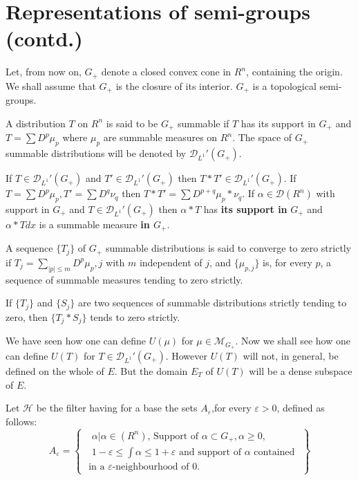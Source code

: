 
\chapter{Representations of semi-groups (contd.)}\label{chap19}

Let\pageoriginale, from now on, $G_+$ denote a closed convex cone in
$R^n$, containing the origin. We shall assume that $G_+$ is the
closure of its interior. $G_+$ is a topological semi-groups.
\setcounter{section}{19}
\setcounter{definition}{0}
\begin{definition}\label{chap19:def19.1}
A distribution $T$ on $R^n$ is said to be $G_+$ summable if $T$ has
its support in $G_+$ and $T=\sum D^p\mu_p$ where $\mu_p$ are summable
measures on $R^n$. The space of $G_+$ summable distributions will be
denoted by $\mathscr{D}_{L^1}'(G_+)$. 

If $T\in\mathscr{D}_{L^1}'(G_+)$ and $T'\in\mathscr{D}_{L^1}'(G_+)$
then $T*T'\in\mathscr{D}_{L^1}'(G_+)$. If $T=\sum D^p\mu_p, T'=\sum
D^q\nu_q$ then $T*T'=\sum D^{p+q}\mu_p *\nu_q$. If
$\alpha\in\mathscr{D}(R^n)$ with support in $G_+$ and $T\in
\mathscr{D}_{L^1}'(G_+)$ then $\alpha * T$ has {\bf its support in}
$G_+$ and $\alpha *T d x$ is a summable measure {\bf in $G_+$}. 
\end{definition}
\begin{definition}\label{chap19:def19.2}
A sequence $\{T_j\}$ of $G_+$ summable distributions is said to
converge to zero strictly if $T_j=\sum\limits_{|p|\leq m}D^p\mu_p, j$
with $m$ independent of $j$, and $\{\mu_{p, j}\}$ is, for every $p$, a
sequence of summable measures tending to zero strictly. 

If $\{T_j\}$ and $\{S_j\}$ are two sequences of summable distributions
strict\-ly tending to zero, then $\{T_j *S_j\}$ tends to zero strictly. 

We have seen how one can define $U(\mu)$ for $\mu\in
\mathscr{M}_{G_+}$. Now we shall see how one can define $U(T)$ for $T
\in \mathscr{D}_{L^1}'(G_+)$. However $U(T)$ will not, in general, be
defined on the whole of $E$. But the domain $E_T$ of $U(T)$ will be a
dense subspace of $E$.
\end{definition}

\begin{definition}\label{chap19:def19.3}
Let $\mathscr{H}$ be the filter having for a base the sets
$A_{\varepsilon}$,\break for every $\varepsilon > 0$, defined as follows: 
$$
A_{\varepsilon}= \left\{\begin{array}{l}
\mbox{ $\alpha|\alpha\in(R^n)$, Support of
  $\alpha\subset G_+, \alpha\geq 0$,  }\\
\mbox{ $1-\varepsilon\leq\int\alpha\leq 1+\varepsilon$ and support of
  $\alpha$ contained  }\\
\mbox{ in a $\varepsilon$-neighbourhood of $0$. }
\end{array}\right\}
$$\pageoriginale
\end{definition}

